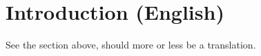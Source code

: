 \chapter{Introduction (English)}
\label{ch:intro-en}

See the section above, should more or less be a translation.